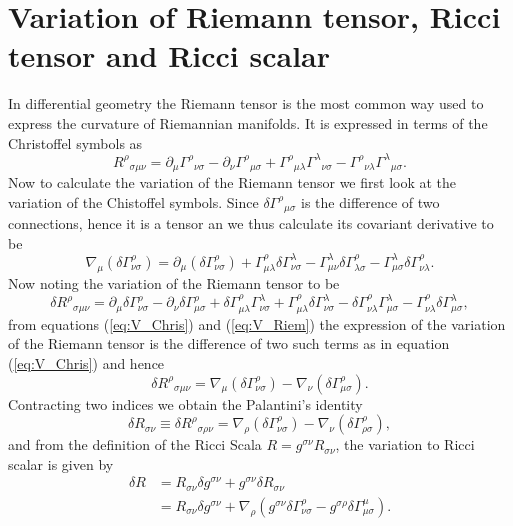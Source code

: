 \documentclass[12pt,a4paper,oneside]{book}
\newcommand{\eq}[2]{\begin{equation} \label{eq:#1} #2 \end{equation}}
\newcommand{\aeq}[2]{\begin{align} \label{eq:#1} #2 \end{align}}
\newcommand{\Eref}[1]{(\ref{eq:#1})}
\begin{document}
\section{Variation of Riemann tensor, Ricci tensor and Ricci scalar}
In differential geometry the Riemann tensor is the most common way used to express the curvature of Riemannian manifolds. It is expressed in terms of the Christoffel symbols as
\eq{}{R^{\rho }{}_{\sigma \mu \nu }=\partial _{\mu }\Gamma ^{\rho }{}_{\nu \sigma }-\partial _{\nu }\Gamma ^{\rho }{}_{\mu \sigma }+\Gamma ^{\rho }{}_{\mu \lambda }\Gamma ^{\lambda }{}_{\nu \sigma }-\Gamma ^{\rho }{}_{\nu \lambda }\Gamma ^{\lambda }{}_{\mu \sigma }.}
Now to calculate the variation of the Riemann tensor we first look at the variation of the Chistoffel symbols. Since $\delta \Gamma ^{\rho }{}_{\mu \sigma }$ is the difference of two connections, hence it is a tensor an we thus calculate its covariant derivative to be 
\eq{V_Chris}{\nabla _{\mu }\left(\delta \Gamma _{\nu \sigma }^{\rho }\right)=\partial _{\mu }(\delta \Gamma _{\nu \sigma }^{\rho })+\Gamma _{\mu \lambda }^{\rho }\delta \Gamma _{\nu \sigma }^{\lambda }-\Gamma _{\mu \nu }^{\lambda }\delta \Gamma _{\lambda \sigma }^{\rho }-\Gamma _{\mu \sigma }^{\lambda }\delta \Gamma _{\nu \lambda }^{\rho }.}
Now noting the variation of the Riemann tensor to be 
\eq{V_Riem}{\delta {R^{\rho }}_{\sigma \mu \nu }=\partial _{\mu }\delta \Gamma _{\nu \sigma }^{\rho }-\partial _{\nu }\delta \Gamma _{\mu \sigma }^{\rho }+\delta \Gamma _{\mu \lambda }^{\rho }\Gamma _{\nu \sigma }^{\lambda }+\Gamma _{\mu \lambda }^{\rho }\delta \Gamma _{\nu \sigma }^{\lambda }-\delta \Gamma _{\nu \lambda }^{\rho }\Gamma _{\mu \sigma }^{\lambda }-\Gamma _{\nu \lambda }^{\rho }\delta \Gamma _{\mu \sigma }^{\lambda },}
from equations \Eref{V_Chris} and \Eref{V_Riem} the expression of the variation of the Riemann tensor is the difference of two such terms as in equation \Eref{V_Chris} and hence
\eq{}{\delta {R^{\rho }}_{\sigma \mu \nu }=\nabla _{\mu }\left(\delta \Gamma _{\nu \sigma }^{\rho }\right)-\nabla _{\nu }\left(\delta \Gamma _{\mu \sigma }^{\rho }\right).}
Contracting two indices we obtain the Palantini's identity 
\eq{}{\delta R_{\sigma \nu }\equiv \delta {R^{\rho }}_{\sigma \rho \nu }=\nabla _{\rho }\left(\delta \Gamma _{\nu \sigma }^{\rho }\right)-\nabla _{\nu }\left(\delta \Gamma _{\rho \sigma }^{\rho }\right),}
and from the definition of the Ricci Scala $R = g^{\sigma\nu}R_{\sigma\nu}$, the variation to Ricci scalar is given by
\aeq{}{\delta R&=R_{\sigma \nu }\delta g^{\sigma \nu }+g^{\sigma \nu }\delta R_{\sigma \nu }\nonumber\\&=R_{\sigma \nu }\delta g^{\sigma \nu }+\nabla _{\rho }\left(g^{\sigma \nu }\delta \Gamma _{\nu \sigma }^{\rho }-g^{\sigma \rho }\delta \Gamma _{\mu \sigma }^{\mu }\right).}
\end{document}
